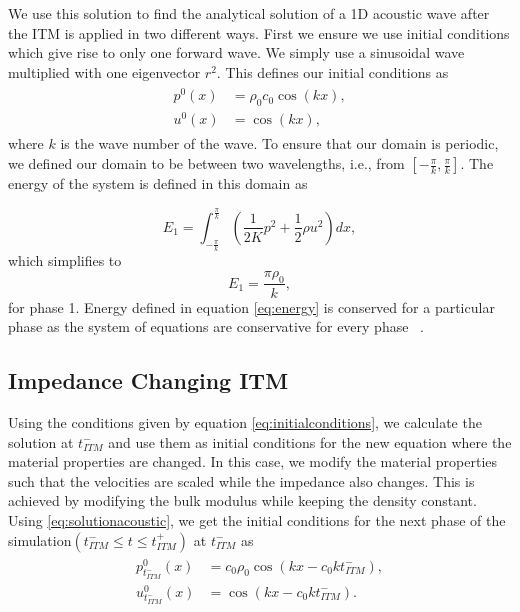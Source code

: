 We use this solution to find the analytical solution of a 1D acoustic wave after the \ac{ITM} is applied in two different ways. First we ensure we use initial conditions which give rise to only one forward wave. We simply use a sinusoidal wave multiplied with one eigenvector $r^2$.
This defines our initial conditions as
\begin{align}
    \begin{split}
        p^0\left(x\right) &= \rho_0c_0 \cos\left(kx\right), \\
        u^0\left(x\right) &= \cos\left(kx\right) ,
    \end{split}
    \label{eq:initialconditions}
\end{align}
where $k$ is the wave number of the wave. To ensure that our domain is periodic, we defined our domain to be between two wavelengths, i.e., from 
$\left[-\frac{\pi}{k}, \frac{\pi}{k}\right]$. The energy of the system is defined in this domain as ~\parencite{Kopriva2021}

\begin{equation}
     E_1 = \int_{-\frac{\pi}{k}}^{\frac{\pi}{k}} \left(\frac{1}{2K}p^2 + \frac{1}{2}\rho u^2\right) dx,
    \label{eq:energy}
\end{equation}
which simplifies to
\begin{equation}
    E_1 = \frac{\pi\rho_0}{k},
\end{equation}
for phase 1. Energy defined in equation \ref{eq:energy} is conserved for a particular phase as the system of equations are conservative for every phase ~\parencite{Kopriva2021}. 

\subsection{\texorpdfstring{Impedance Changing \ac{ITM}}{Impedance Changing ITM}}\label{section:impedancechangingITM}
Using the conditions given by equation \ref{eq:initialconditions}, we calculate the solution at $t_{ITM}^-$ and use them as initial conditions for the new equation where the material properties are changed.
In this case, we modify the material properties such that the velocities are scaled while the impedance also changes. This is achieved by modifying the bulk modulus while keeping the density constant. Using \ref{eq:solutionacoustic}, we get the initial conditions for the next phase of the simulation$\left(t_{ITM}^- \leq t \leq t_{ITM}^+ \right)$ at $t_{ITM}^-$ as
\begin{align}
    \begin{split}
        p^0_{t_{ITM}^-}\left(x\right) &= c_0 \rho_0 \cos\left(kx - c_0kt_{ITM}^-\right), \\
        u^0_{t_{ITM}^-}\left(x\right) &= \cos\left(kx - c_0kt_{ITM}^-\right) .
    \end{split}
\end{align}

